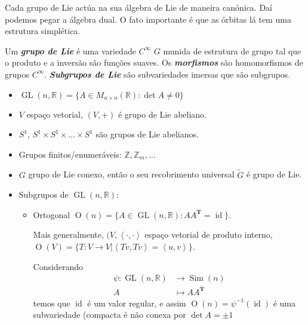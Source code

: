 Cada grupo de Lie act\'ua na sua \'algebra de Lie de maneira can\'onica. Da\'i podemos pegar a \'algebra dual. O fato importante \'e que as \'orbitas l\'a tem uma estrutura simpl\'etica.

\begin{defn}
	Um \textit{\textbf{grupo de Lie}} \'e uma variedade $C^\infty$ $G$ munida de estrutura de grupo tal que o produto e a invers\~ao s\~ao fun\c c\~oes  suaves. Os \textit{\textbf{morfismos}} s\~ao homomorfismos de grupos $C^\infty$. \textit{\textbf{Subgrupos de Lie}} s\~ao subvariedades imersas que s\~ao subgrupos.
\end{defn}

\begin{example}\leavevmode
	\begin{itemize}
	\item $\operatorname{GL}(n,\mathbb{R})=\{A\in M_{n\times n}(\mathbb{R}):\det A \neq 0\}$ 
	\item $V$ espaço vetorial, $(V,+)$  \'e grupo de Lie abeliano.
	\item  $S^1$, $S^1\times S^1\times \ldots\times S^1$ s\~ao grupos de Lie abelianos.
	\item Grupos finitos/enumer\'aveis: $\mathbb{Z},\mathbb{Z}_m,\ldots$ 
	\item 
		\begin{exercise}
			$G$ grupo de Lie conexo, ent\~ao o seu recobrimento universal $\tilde{G}$ \'e grupo de Lie.
		\end{exercise}
	\item Subgrupos de $\operatorname{GL}(n,\mathbb{R})$:
		\begin{itemize}
		\item Ortogonal $\operatorname{O}(n)=\{A\in\operatorname{GL}(n,\mathbb{R}):A A^{\mathbf{T}}=\operatorname{id}\}$.

			Mais generalmente, $(V,\left<\cdot,\cdot\right> $ espaço vetorial de produto interno, $\operatorname{O}(V) =\{T:V\to V|\left<Tv,Tv\right> =\left<u,v\right> \}$.

			Considerando
			\begin{align*}
				\psi:\operatorname{GL}(n,\mathbb{R}) &\longrightarrow \operatorname{Sim}(n) \\
				A &\longmapsto A A^{\mathbf{T}}
			\end{align*}
			temos que $\operatorname{id}$ \'e um valor regular, e assim $\operatorname{O}(n)=\psi^{-1}(\operatorname{id})$ \'e uma subvariedade (compacta \'e n\~ao conexa por $\det A=\pm 1$
	

\end{itemize}
\end{itemize}
\end{example}
